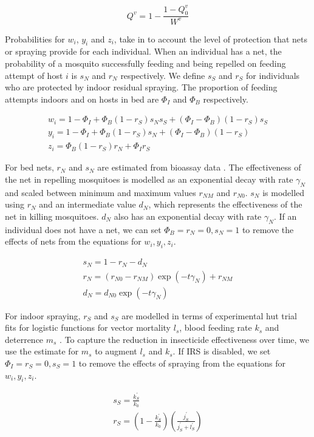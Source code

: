 \documentclass{bmcart}
\begin{document}
\[
Q^v = 1 - \frac{1 - Q^v_0}{W^v}
\]

Probabilities for $w_i$, $y_i$ and $z_i$, take in to account the level of protection that nets or spraying provide for each individual. When an individual has a net, the probability of a mosquito successfully feeding and being repelled on feeding attempt of host $i$ is $s_N$ and $r_N$ respectively. We define $s_S$ and $r_S$ for individuals who are protected by indoor residual spraying. The proportion of feeding attempts indoors and on hosts in bed are $\Phi_I$ and $\Phi_B$ respectively.

\begin{gather*}
    w_i = 1 - \Phi_I + \Phi_B(1 -  r_S)s_Ns_S + (\Phi_I - \Phi_B)(1 - r_S)s_S\\
    y_i = 1 - \Phi_I + \Phi_B(1 -  r_S)s_N + (\Phi_I - \Phi_B)(1 - r_S)\\
    z_i = \Phi_B(1 - r_S)r_N + \Phi_Ir_S
\end{gather*}

For bed nets, $r_N$ and $s_N$ are estimated from bioassay data \cite{sherrard-smith_systematic_2018}. The effectiveness of the net in repelling mosquitoes is modelled as an exponential decay with rate $\gamma_N$ and scaled between minimum and maximum values $r_{NM}$ and $r_{N0}$. $s_N$ is modelled using $r_N$ and an intermediate value $d_N$, which represents the effectiveness of the net in killing mosquitoes. $d_N$ also has an exponential decay with rate $\gamma_N$. If an individual does not have a net, we can set $\Phi_B = r_N = 0, s_N = 1$ to remove the effects of nets from the equations for $w_i, y_i, z_i$.

\begin{gather*}
    s_N = 1 - r_N - d_N \\
    r_N = (r_{N0} - r_{NM})\exp(-t\gamma_N) + r_{NM} \\
    d_N = d_{N0}\exp(-t\gamma_N)
\end{gather*}

For indoor spraying, $r_S$ and $s_S$ are modelled in terms of experimental hut trial fits for logistic functions for vector mortality $l_s$, blood feeding rate $k_s$ and deterrence $m_s$ \cite{sherrard-smith_systematic_2018}. To capture the reduction in insecticide effectiveness over time, we use the estimate for $m_s$ to augment $l_s$ and $k_s$. If IRS is disabled, we set $\Phi_I = r_S = 0, s_S = 1$ to remove the effects of spraying from the equations for $w_i, y_i, z_i$.

\begin{gather*}
    s_S = \frac{k^\prime_S}{k_0} \\
    r_S = \left(1 - \frac{k^\prime_S}{k_0}\right)\left(\frac{j^\prime_S}{j^\prime_S + l^\prime_S}\right) \\
\end{gather*}
\end{document}
